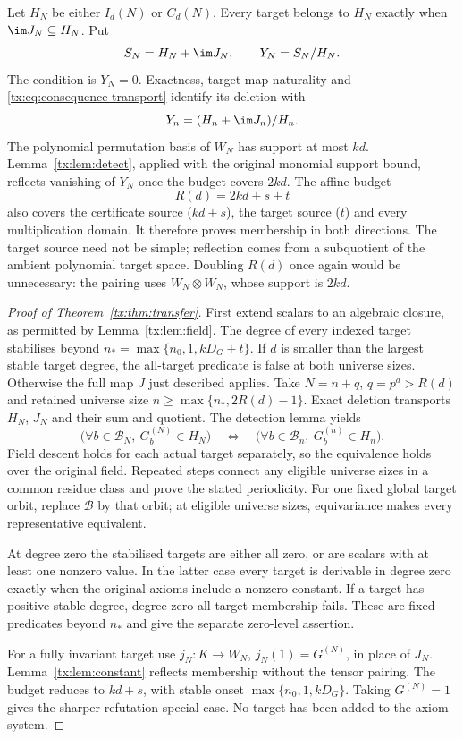 Let $H_N$ be either $I_d(N)$ or $C_d(N)$. Every target belongs to
$H_N$ exactly when $\im J_N\subseteq H_N$. Put
\[
          S_N=H_N+\im J_N,\qquad Y_N=S_N/H_N.
\]
The condition is $Y_N=0$. Exactness, target-map naturality and
\eqref{tx:eq:consequence-transport} identify its deletion with
\[
          Y_n=(H_n+\im J_n)/H_n.
\]
The polynomial permutation basis of $W_N$ has support at most $kd$.
Lemma~\ref{tx:lem:detect}, applied with the original monomial support bound,
reflects vanishing of $Y_N$ once the budget covers $2kd$.
The affine budget
\[
                            R(d)=2kd+s+t
\]
also covers the certificate source ($kd+s$), the target source ($t$)
and every multiplication domain. It therefore proves membership in
both directions. The target source need not be simple; reflection
comes from a subquotient of the ambient polynomial target space.
Doubling $R(d)$ once again would be unnecessary: the pairing uses
$W_N\otimes W_N$, whose support is $2kd$.

\begin{proof}[Proof of Theorem~\ref{tx:thm:transfer}]
First extend scalars to an algebraic closure, as permitted by
Lemma~\ref{tx:lem:field}. The degree of every indexed target stabilises
beyond $n_*=\max\{n_0,1,kD_G+t\}$. If $d$ is smaller than the
largest stable target degree, the all-target predicate is false at both
universe sizes. Otherwise the full map $J$ just described applies.
Take $N=n+q$, $q=p^a>R(d)$ and retained universe size
$n\ge\max\{n_*,2R(d)-1\}$. Exact deletion transports $H_N$, $J_N$
and their sum and quotient. The detection lemma yields
\[
 \bigl(\forall b\in\mathcal B_N,\ G_b^{(N)}\in H_N\bigr)
 \quad\Longleftrightarrow\quad
 \bigl(\forall b\in\mathcal B_n,\ G_b^{(n)}\in H_n\bigr).
\]
Field descent holds for each actual target separately, so the equivalence
holds over the original field. Repeated steps connect any eligible
universe sizes in a common residue class and prove the stated periodicity.
For one fixed global target orbit, replace $\mathcal B$ by that orbit;
at eligible universe sizes, equivariance makes every representative equivalent.

At degree zero the stabilised targets are either all zero, or are
scalars with at least one nonzero value. In the latter case every target
is derivable in degree zero exactly when the original axioms include a
nonzero constant. If a target has positive stable degree, degree-zero
all-target membership fails. These are fixed predicates beyond $n_*$
and give the separate zero-level assertion.

For a fully invariant target use $j_N:K\to W_N$, $j_N(1)=G^{(N)}$,
in place of $J_N$. Lemma~\ref{tx:lem:constant} reflects membership without
the tensor pairing. The budget reduces to $kd+s$, with stable onset
$\max\{n_0,1,kD_G\}$. Taking $G^{(N)}=1$ gives the sharper refutation
special case. No target has been added to the axiom system.
\end{proof}


